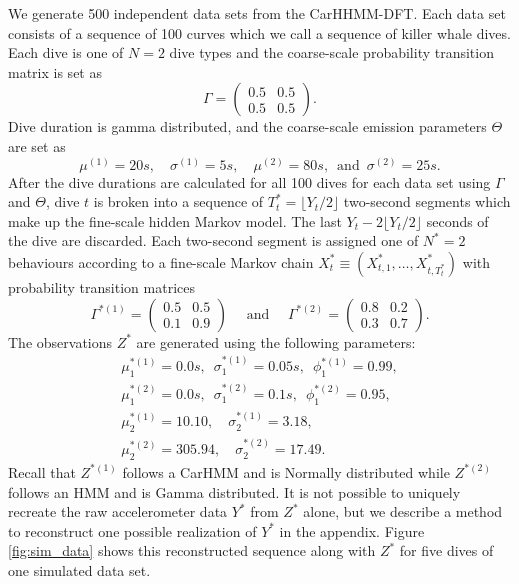 We generate 500 independent data sets from the CarHHMM-DFT. Each data set consists of a sequence of 100 curves which we call a sequence of killer whale dives. Each dive is one of $N=2$ dive types and the coarse-scale probability transition matrix is set as
%
$$\Gamma = \begin{pmatrix} 0.5 & 0.5 \\ 0.5 & 0.5 \end{pmatrix}.$$
%
Dive duration is gamma distributed, and the coarse-scale emission parameters $\Theta$ are set as
$$
    \mu^{(1)} = 20s, \quad \sigma^{(1)} = 5s, \quad
    \mu^{(2)} = 80s, \enspace \text{and} \enspace \sigma^{(2)} = 25s.
$$
%
After the dive durations are calculated for all 100 dives for each data set using $\Gamma$ and $\Theta$, dive $t$ is broken into a sequence of $T^*_t = \lfloor Y_t/2 \rfloor$ two-second segments which make up the fine-scale hidden Markov model. The last $Y_t - 2\lfloor Y_t/2 \rfloor$ seconds of the dive are discarded. Each two-second segment is assigned one of $N^*=2$ behaviours according to a fine-scale Markov chain $X^*_t \equiv \left(X^*_{t,1}, \ldots, X^*_{t,T^*_t} \right)$ with probability transition matrices
%
$$\Gamma^{*(1)} = \begin{pmatrix} 0.5 & 0.5 \\ 0.1 & 0.9 \end{pmatrix} \quad \text{ and } \quad \Gamma^{*(2)} = \begin{pmatrix} 0.8 & 0.2 \\ 0.3 & 0.7 \end{pmatrix}.$$ 
%
The observations $Z^*$ are generated using the following parameters:
%
\begin{gather*}
    \mu_1^{*(1)} = 0.0 s, \enspace \sigma_1^{*(1)} = 0.05s, \enspace \phi_1^{*(1)} = 0.99, \\
    \mu_1^{*(2)} = 0.0 s, \enspace \sigma_1^{*(2)} = 0.1s, \enspace \phi_1^{*(2)} = 0.95, \\
    \mu_2^{*(1)} = 10.10, \quad \sigma_2^{*(1)} = 3.18, \\
    \mu_2^{*(2)} = 305.94, \quad \sigma_2^{*(2)} = 17.49.
\end{gather*}
%
Recall that $Z^{*(1)}$ follows a CarHMM and is Normally distributed while $Z^{*(2)}$ follows an HMM and is Gamma distributed. It is not possible to uniquely recreate the raw accelerometer data $Y^*$ from $Z^*$ alone, but we describe a method to reconstruct one possible realization of $Y^*$ in the appendix. Figure \ref{fig:sim_data} shows this reconstructed sequence along with $Z^*$ for five dives of one simulated data set.

